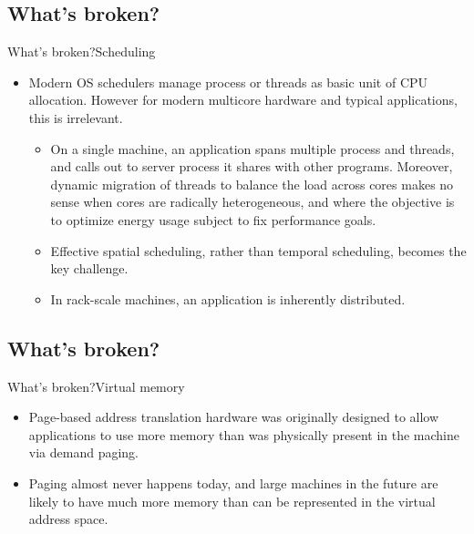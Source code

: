 \documentclass[10pt]{beamer}
\begin{document}
\subsection{What's broken?}
\begin{frame}{What's broken?}{Scheduling}
  \begin{itemize}
    \item Modern OS schedulers manage process or threads as basic unit of CPU
          allocation. However for modern multicore hardware and typical
          applications, this is irrelevant.
    \begin{itemize}
      \item On a single machine, an application spans multiple process and
            threads, and calls out to server process it shares with other
            programs. Moreover, dynamic migration of threads to balance the
            load across cores makes no sense when cores are radically
            heterogeneous, and where the objective is to optimize energy usage
            subject to fix performance goals.
      \item Effective spatial scheduling, rather than temporal scheduling,
            becomes the key challenge.
      \item In rack-scale machines, an application is inherently distributed.
    \end{itemize}
  \end{itemize}
\end{frame}

\subsection{What's broken?}
\begin{frame}{What's broken?}{Virtual memory}
  \begin{itemize}
    \item Page-based address translation hardware was originally designed to
          allow applications to use more memory than was physically present in
          the machine via demand paging.
    \item Paging almost never happens today, and large machines in the future
          are likely to have much more memory than can be represented in the
          virtual address space.
  \end{itemize}
\end{frame}
\end{document}
